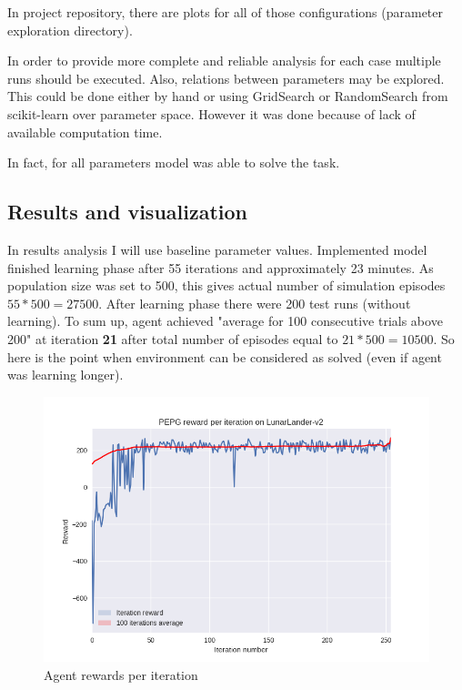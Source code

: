 \documentclass[12pt]{article}
\begin{document}
In project repository, there are plots for all of those configurations (parameter exploration directory).


In order to provide more complete and reliable analysis for each case multiple runs should be executed. Also, relations between parameters may be explored. This could be done either by hand or using GridSearch or RandomSearch from scikit-learn\cite{sklearn} over parameter space. However it was done because of lack of available computation time.

In fact, for all parameters model was able to solve the task.

\subsection{Results and visualization}

In results analysis I will use baseline parameter values. Implemented model finished learning phase after 55 iterations and approximately 23 minutes. As population size was set to 500, this gives actual number of simulation episodes  $55 * 500 = 27500$. After learning phase there were 200 test runs (without learning). To sum up, agent achieved "average for 100 consecutive trials above 200" at iteration \textbf{21} after total number of episodes equal to $21 * 500 = 10500$. So here is the point when environment can be considered as solved (even if agent was learning longer).

\begin{figure}[!h]
\centering
\includegraphics[scale=0.9]{final_plot.png} 
\caption{Agent rewards per iteration}
\end{figure}
\end{document}
